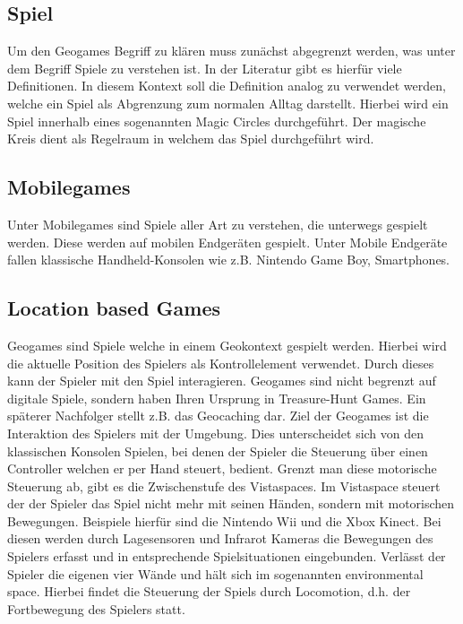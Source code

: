 \subsection*{Spiel}

Um den Geogames Begriff zu klären muss zunächst abgegrenzt werden, was unter dem Begriff Spiele zu verstehen ist. In der Literatur gibt es hierfür viele Definitionen.
In diesem Kontext soll die Definition analog zu \cite{Salen.2010} verwendet werden, welche ein Spiel als Abgrenzung zum normalen Alltag darstellt. Hierbei wird ein Spiel innerhalb eines sogenannten Magic Circles durchgeführt.
Der magische Kreis dient als Regelraum in welchem das Spiel durchgeführt wird.


\subsection*{Mobilegames}

Unter Mobilegames sind Spiele aller Art zu verstehen, die unterwegs gespielt werden. Diese werden auf mobilen Endgeräten gespielt. \cite{Bell.2006} Unter Mobile Endgeräte fallen klassische Handheld-Konsolen wie z.B. Nintendo Game Boy, Smartphones.

\subsection*{Location based Games}

Geogames sind Spiele welche in einem Geokontext gespielt werden. Hierbei wird die aktuelle Position des Spielers als Kontrollelement verwendet\citep{Schlieder.2006}. Durch dieses kann der Spieler mit den Spiel interagieren.
Geogames sind nicht begrenzt auf digitale Spiele, sondern haben Ihren Ursprung in Treasure-Hunt Games. Ein späterer Nachfolger stellt z.B. das Geocaching dar.
Ziel der Geogames ist die Interaktion des Spielers mit der Umgebung. Dies unterscheidet sich von den klassischen Konsolen Spielen, bei denen der Spieler die Steuerung über einen Controller welchen er per Hand steuert, bedient. Grenzt man diese motorische Steuerung ab, gibt es die Zwischenstufe des Vistaspaces. Im Vistaspace steuert der der Spieler das Spiel nicht mehr mit seinen Händen, sondern mit motorischen Bewegungen. Beispiele hierfür sind die Nintendo Wii und die Xbox Kinect. Bei diesen werden durch Lagesensoren und Infrarot Kameras die Bewegungen des Spielers erfasst und in entsprechende Spielsituationen eingebunden.
Verlässt der Spieler die eigenen vier Wände und hält sich im sogenannten environmental space.
Hierbei findet die Steuerung der Spiels durch Locomotion, d.h. der Fortbewegung des Spielers statt. \cite{Benford.2003,Kiefer.2007}

